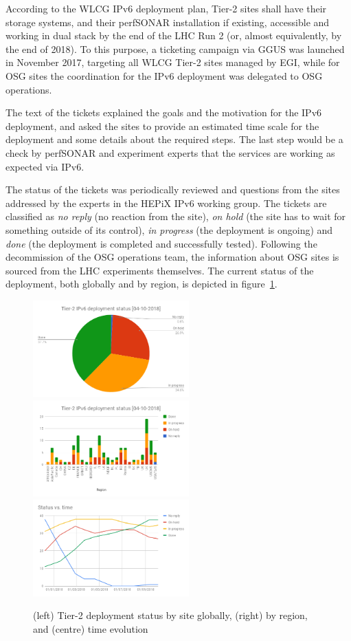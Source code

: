 According to the WLCG IPv6 deployment plan, Tier-2 sites shall have
their storage systems, and their perfSONAR installation if existing,
accessible and working in dual stack by the end of the LHC Run 2 (or,
almost equivalently, by the end of 2018). To this purpose, a ticketing
campaign via GGUS was launched in November 2017, targeting all WLCG Tier-2
sites managed by EGI, while for OSG sites the coordination for the
IPv6 deployment was delegated to OSG operations.

The text of the tickets explained the goals and the motivation for the
IPv6 deployment, and asked the sites to provide an estimated time
scale for the deployment and some details about the required
steps. The last step would be a check by perfSONAR and experiment
experts that the services are working as expected via IPv6.

The status of the tickets was periodically reviewed and questions from
the sites addressed by the experts in the HEPiX IPv6 working
group. The tickets are classified as {\it no reply} (no reaction from
the site), {\it on hold} (the site has to wait for something outside
of its control), {\it in progress} (the deployment is ongoing) and
{\it done} (the deployment is completed and successfully
tested). Following the decommission of the OSG operations team, the
information about OSG sites is sourced from the LHC experiments
themselves. The current status of the deployment, both globally and by
region, is depicted in figure~\ref{fig:t2depl}.
\begin{figure}[t]
\centering
\includegraphics[width=6cm]{chart2}
\includegraphics[width=6cm]{chart}
\includegraphics[width=6cm]{chart3}
\caption{(left) Tier-2 deployment status by site globally, (right) by region, and (centre) time evolution}
\label{fig:t2depl}
\end{figure}

